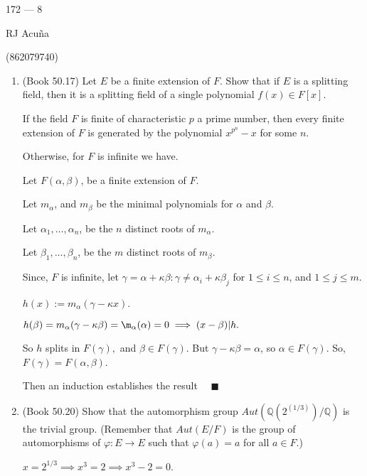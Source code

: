 \documentclass{article}
\newcommand\Q{\mathbb{Q}}
\begin{document}
\begin{center}
  172 --- 8

  RJ Acuña

  (862079740)
\end{center}\vspace{1.618em}



\begin{enumerate}

\item (Book 50.17) Let $E$ be a finite extension of $F$. Show that if $E$ is a splitting field, then it is a splitting field of a single polynomial $f(x) \in F[x]$.


  If the field $F$ is finite of characteristic $p$ a prime number, then every finite extension of $F$ is
  generated by the polynomial $x^{p^n}-x$ for some $n$.

  Otherwise, for $F$ is infinite we have.

  Let $F(\alpha,\beta)$, be a finite extension of $F$.

  Let $m_{\alpha}$, and $m_{\beta}$ be the minimal polynomials
  for $\alpha$ and $\beta$.

  Let $\alpha_1,\dots, \alpha_n$, be the $n$ distinct roots of $m_{\alpha}$.

  Let $\beta_1,\dots, \beta_n$, be the $m$ distinct roots of $m_{\beta}$.

  Since, $F$ is infinite, let $\gamma = \alpha + \kappa\beta : \gamma
  \neq \alpha_i +\kappa \beta_j$ for $1\leq i\leq n$, and $1\leq j\leq
  m.$

  $h(x) := m_{\alpha}(\gamma - \kappa x)$.

  $h(\beta) = m_{\alpha}(\gamma - \kappa \beta) =  \m_{\alpha}(\alpha)
  = 0 \implies (x-\beta)| h.$

  So $h$ splits in $F(\gamma),$ and $\beta \in F(\gamma)$. But $\gamma
 -\kappa \beta = \alpha$, so $\alpha \in F(\gamma).$ So, $F(\gamma) =
 F(\alpha,\beta)$.

 Then an induction establishes the result $\quad \blacksquare$

\item (Book 50.20) Show that the automorphism group $Aut(\Q(2^{(1/3)})/ \Q)$ is the trivial group. (Remember that $Aut(E/F)$ is the group of automorphisms of $\varphi:E \to E$ such that $\varphi(a) = a$ for all $a \in F$.)


  $x = 2^{1/3} \implies x^3 = 2 \implies x^3-2 = 0$.


\end{enumerate}
\end{document}
